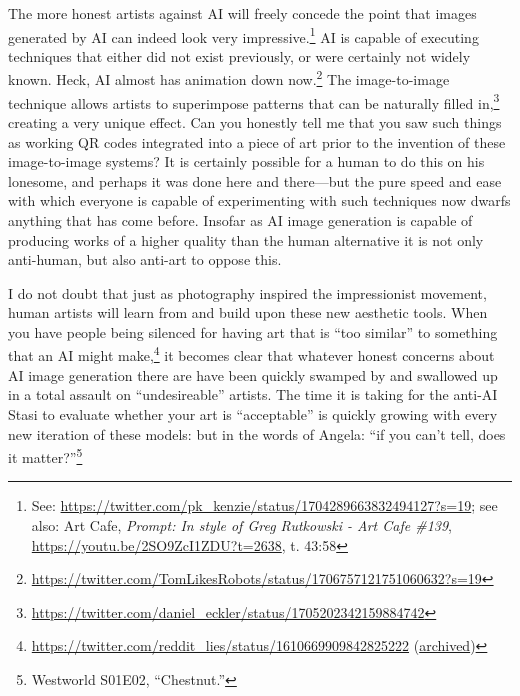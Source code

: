 \documentclass[11pt]{article}
\begin{document}
The more honest artists against AI will freely concede the point that images generated by AI can indeed look very impressive.\footnote{See: \url{https://twitter.com/pk\_kenzie/status/1704289663832494127?s=19}; see also: Art Cafe, \emph{Prompt: In style of Greg Rutkowski - Art Cafe \#139}, \url{https://youtu.be/2SO9ZcI1ZDU?t=2638}, t. 43:58} AI is capable of executing techniques that either did not exist previously, or were certainly not widely known. Heck, AI almost has animation down now.\footnote{\url{https://twitter.com/TomLikesRobots/status/1706757121751060632?s=19}} The image-to-image technique allows artists to superimpose patterns that can be naturally filled in,\footnote{\url{https://twitter.com/daniel\_eckler/status/1705202342159884742}} creating a very unique effect. Can you honestly tell me that you saw such things as working QR codes integrated into a piece of art prior to the invention of these image-to-image systems? It is certainly possible for a human to do this on his lonesome, and perhaps it was done here and there---but the pure speed and ease with which everyone is capable of experimenting with such techniques now dwarfs anything that has come before. Insofar as AI image generation is capable of producing works of a higher quality than the human alternative it is not only anti-human, but also anti-art to oppose this.

I do not doubt that just as photography inspired the impressionist movement, human artists will learn from and build upon these new aesthetic tools. When you have people being silenced for having art that is ``too similar'' to something that an AI might make,\footnote{\url{https://twitter.com/reddit\_lies/status/1610669909842825222} (\href{https://archive.ph/jI2To}{archived})} it becomes clear that whatever honest concerns about AI image generation there are have been quickly swamped by and swallowed up in a total assault on ``undesireable'' artists. The time it is taking for the anti-AI Stasi to evaluate whether your art is ``acceptable'' is quickly growing with every new iteration of these models: but in the words of Angela: ``if you can't tell, does it matter?''\footnote{Westworld S01E02, ``Chestnut.''}
\end{document}
